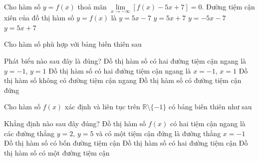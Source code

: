 \begin{ex}%
	Cho hàm số  $y=f(x)$ thoả mãn $\lim\limits_{x \to - \infty } [f(x)-5x+7]=0$. Đường tiệm cận xiên của đồ thị hàm số $y=f(x)$ là
	 \choice
		 {\True $y=5x-7$}
		 {$y=5x+7$}
		 {$y=-5x-7$}
		 {$y=5x+7$}
\end{ex}

\begin{ex}%
	Cho hàm số phù hợp với bảng biến thiên sau 
	\begin{center}
	\end{center}
	Phát biểu nào sau đây là  đúng?
	\choice 
		{\True Đồ thị hàm số có hai đường tiệm  cận ngang là $y=-1$, $y=1$}
		{Đồ thị hàm  số có hai đường tiệm cận ngang là $x=-1$, $x=1$}
		{Đồ thị hàm  số không có đường tiệm cận ngang}
		{Đồ thị hàm  số có đường tiệm cận đứng}
\end{ex}

\begin{ex}%
	Cho hàm số $f(x)$ xác định và liên tục trên $\mathbb{R}\setminus \{-1\}$  có bảng biến thiên như sau
	\begin{center}
	\end{center}
	Khẳng định nào sau đây đúng? 
	 \choice
		{\True Đồ thị hàm số $f(x)$ có hai tiệm cận ngang  là các đường thẳng $y=2$, $y=5$ và có một tiệm cận đứng là đường thẳng $x=-1$}
		{Đồ  thị hàm số có bốn đường tiệm cận}
		{Đồ thị hàm số có  hai đường tiệm cận}
		{Đồ thị hàm số có một  đường tiệm cận}
\end{ex}

